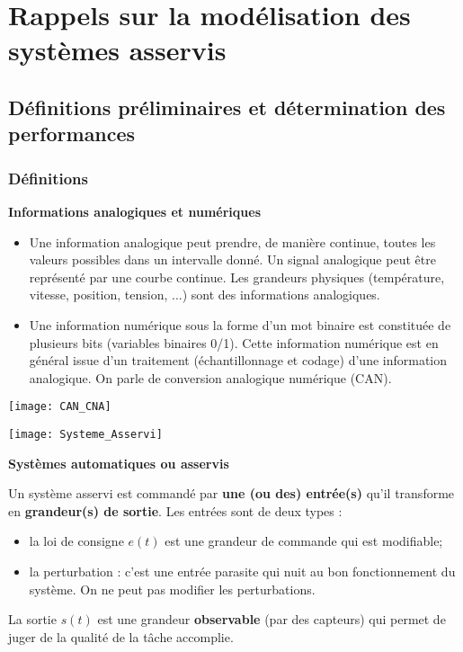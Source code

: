 \setchapterpreamble[u]{\margintoc}

\chapter{Rappels sur la modélisation des systèmes asservis}
\section{Définitions préliminaires et détermination des performances}

\subsection{Définitions}

\begin{defi}\textbf{Informations analogiques et numériques}
\begin{itemize}%
\item Une information analogique peut prendre, de manière continue, toutes les valeurs
possibles dans un intervalle donné. Un signal analogique peut être représenté
par une courbe continue. Les grandeurs physiques (température, vitesse,
position, tension, ...) sont des informations analogiques.

\item Une information numérique sous la forme d'un mot binaire est constituée de
plusieurs bits (variables binaires 0/1). Cette information numérique est en
général issue d'un traitement (échantillonnage et codage) d'une information
analogique. On parle de conversion analogique numérique (CAN).
\end{itemize}
\end{defi}

\begin{center}
\texttt{[image: CAN\_CNA]}
\end{center}

\begin{marginfigure}[1cm]
\texttt{[image: Systeme\_Asservi]}
\end{marginfigure}

\begin{defi}\textbf{Systèmes automatiques ou asservis}

Un système asservi est commandé par \textbf{une (ou des) entrée(s)} qu'il
transforme en \textbf{grandeur(s) de sortie}.
Les entrées sont de deux types : 
\begin{itemize}
\item la loi de consigne $e(t)$ est une grandeur de commande qui est modifiable;
\item la perturbation : c'est une entrée parasite qui nuit au bon
fonctionnement du système. On ne peut pas modifier les perturbations.
\end{itemize}

La sortie $s(t)$ est une grandeur \textbf{observable} (par des capteurs) qui
permet de juger de la qualité de la tâche accomplie.
\end{defi} 




